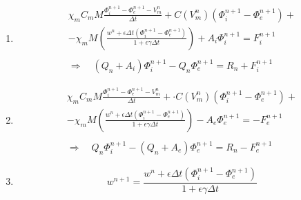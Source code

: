 \documentclass[a4paper]{article}
\theoremstyle{definition}
\begin{document}
\vspace{5mm}
\begin{enumerate}
	\item 
	\begin{equation}
	\begin{gathered}
	\chi_m C_m M \frac{	\Phi_i^{n+1}-\Phi_e^{n+1}-V_m^{n}}{\Delta t} +  C(V_m^n) (\Phi_i^{n+1}-\Phi_e^{n+1}) + \\ - \chi_m M \left(\frac{w^n + \epsilon \Delta t (\Phi_i^{n+1}-\Phi_e^{n+1})}{1+\epsilon \gamma \Delta t}   \right) + A_i \Phi_i ^{n+1} = F_i^{n+1} \\ \\
     \Rightarrow \quad (Q_n + A_i) \Phi_i^{n+1} - Q_n \Phi_e^{n+1} =R_n +  F_i^{n+1}
	\end{gathered}
	\end{equation}
	
    \item 
	\begin{equation}
	\begin{gathered}
	\chi_m C_m M \frac{	\Phi_i^{n+1}-\Phi_e^{n+1}-V_m^{n}}{\Delta t} + \cdot C(V_m^n) (\Phi_i^{n+1}-\Phi_e^{n+1}) + \\ -  \chi_m M \left(\frac{w^n + \epsilon \Delta t (\Phi_i^{n+1}-\Phi_e^{n+1})}{1+\epsilon \gamma \Delta t}   \right) - A_e \Phi_e ^{n+1} = -F_e^{n+1} \\ \\
	\Rightarrow \quad Q_n \Phi_i^{n+1} - (Q_n+A_e) \Phi_e^{n+1} =R_n - F_e^{n+1}
	\end{gathered}
	\end{equation}
	\vspace{3mm}
	\item 
	\begin{equation}
	w^{n+1} = \frac{w^n + \epsilon \Delta t (\Phi_i^{n+1}-\Phi_e^{n+1})}{1+\epsilon \gamma \Delta t}
	\end{equation}
\end{enumerate}
\end{document}
